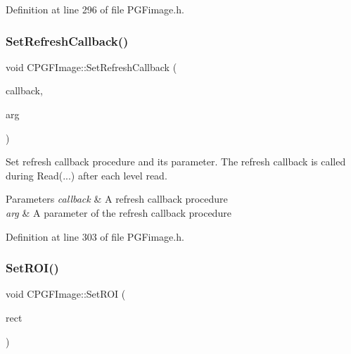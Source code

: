 Definition at line 296 of file P\+G\+Fimage.\+h.


\begin{DoxyCode}{0}

\end{DoxyCode}
\mbox{\label{classCPGFImage_abbca597528f7f9bd28ddd95e8f530e24}} 
\subsubsection{\texorpdfstring{SetRefreshCallback()}{SetRefreshCallback()}}
{\footnotesize\ttfamily void C\+P\+G\+F\+Image\+::\+Set\+Refresh\+Callback (\begin{DoxyParamCaption}\item[{\mbox{\hyperlink{PGFtypes_8h_a80e898ce785fbd6fb0dfcc5903be79c2}{Refresh\+CB}}}]{callback,  }\item[{void $\ast$}]{arg }\end{DoxyParamCaption})\hspace{0.3cm}{\ttfamily [inline]}}

Set refresh callback procedure and its parameter. The refresh callback is called during Read(...) after each level read. 
\begin{DoxyParams}{Parameters}
{\em callback} & A refresh callback procedure \\
\hline
{\em arg} & A parameter of the refresh callback procedure \\
\hline
\end{DoxyParams}


Definition at line 303 of file P\+G\+Fimage.\+h.


\begin{DoxyCode}{0}

\end{DoxyCode}
\mbox{\label{classCPGFImage_a83c737ee649fdc92c55b7a6ffe1153b2}} 
\subsubsection{\texorpdfstring{SetROI()}{SetROI()}}
{\footnotesize\ttfamily void C\+P\+G\+F\+Image\+::\+Set\+R\+OI (\begin{DoxyParamCaption}\item[{\mbox{\hyperlink{structPGFRect}{P\+G\+F\+Rect}}}]{rect }\end{DoxyParamCaption})\hspace{0.3cm}{\ttfamily [private]}}

